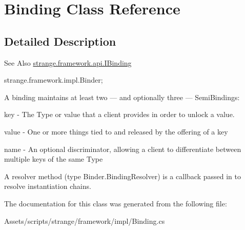 \hypertarget{class_binding}{\section{Binding Class Reference}
\label{class_binding}
}


\subsection{Detailed Description}
\begin{DoxySeeAlso}{See Also}
\hyperlink{interfacestrange_1_1framework_1_1api_1_1_i_binding}{strange.\-framework.\-api.\-I\-Binding} 

strange.\-framework.\-impl.\-Binder;
\end{DoxySeeAlso}
A binding maintains at least two — and optionally three — Semi\-Bindings\-: 
\begin{DoxyItemize}
\item key -\/ The Type or value that a client provides in order to unlock a value. 
\item value -\/ One or more things tied to and released by the offering of a key 
\item name -\/ An optional discriminator, allowing a client to differentiate between multiple keys of the same Type 
\begin{DoxyItemize}
\item 
\end{DoxyItemize}A resolver method (type Binder.\-Binding\-Resolver) is a callback passed in to resolve instantiation chains. 
\end{DoxyItemize}

The documentation for this class was generated from the following file\-:\begin{DoxyCompactItemize}
\item 
Assets/scripts/strange/framework/impl/Binding.\-cs\end{DoxyCompactItemize}
